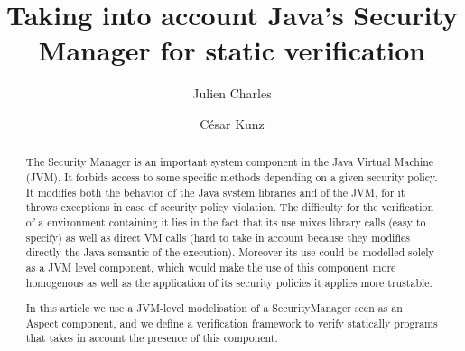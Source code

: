 \documentclass[draft]{llncs}
\begin{document}
\newcommand{\rarrow}{$\rightarrow$}
\newcommand{\conj}{$\wedge$}
\newcommand{\disjonc}{$\vee$}
\newcommand{\s}{\,}
\newcommand{\btab}{\begin{tt}\begin{tabbing}}
\newcommand{\etab}{\end{tabbing}\end{tt}}
\newcommand{\bcode}{\begin{tt}\begin{small}\begin{tabbing}}
\newcommand{\ecode}{\end{tabbing}\end{small}\end{tt}}
%
\frontmatter          %
%

\mainmatter              %
%
\title{Taking into account Java's Security Manager for static verification}
%
%
\author{Julien Charles \and C\'esar Kunz}
%
%
%

\maketitle              %

\begin{abstract}
The Security Manager is an important system component in the Java Virtual Machine (JVM). It forbids access
to some specific methods depending on a given security policy. It modifies both the behavior of 
the Java system libraries and of the JVM, for it throws exceptions in case of security policy 
violation.  The difficulty for the verification of a environment containing it 
lies in the fact that its use mixes library calls (easy to specify) as well as
direct VM calls (hard to take in account because they modifies directly the Java semantic of the execution). 
Moreover its use  could be modelled solely as a JVM level component, which would make the
use of this component more homogenous as well as the application of its security policies it applies 
more trustable.

In this article we use a JVM-level modelisation of a SecurityManager seen as an Aspect component, 
and we define a verification framework to verify statically programs that takes in account the presence 
of this component. 
\end{abstract}
%
\end{document}
